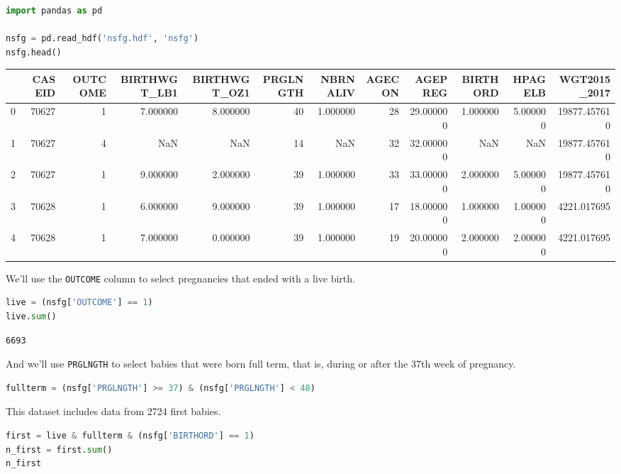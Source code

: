 \begin{lstlisting}[language=Python,style=source]
import pandas as pd

nsfg = pd.read_hdf('nsfg.hdf', 'nsfg')
nsfg.head()
\end{lstlisting}

\begin{tabular}{lrrrrrrrrrrr}
\midrule
 & CASEID & OUTCOME & BIRTHWGT\_LB1 & BIRTHWGT\_OZ1 & PRGLNGTH & NBRNALIV & AGECON & AGEPREG & BIRTHORD & HPAGELB & WGT2015\_2017 \\
\midrule
0 & 70627 & 1 & 7.000000 & 8.000000 & 40 & 1.000000 & 28 & 29.000000 & 1.000000 & 5.000000 & 19877.457610 \\
1 & 70627 & 4 & NaN & NaN & 14 & NaN & 32 & 32.000000 & NaN & NaN & 19877.457610 \\
2 & 70627 & 1 & 9.000000 & 2.000000 & 39 & 1.000000 & 33 & 33.000000 & 2.000000 & 5.000000 & 19877.457610 \\
3 & 70628 & 1 & 6.000000 & 9.000000 & 39 & 1.000000 & 17 & 18.000000 & 1.000000 & 1.000000 & 4221.017695 \\
4 & 70628 & 1 & 7.000000 & 0.000000 & 39 & 1.000000 & 19 & 20.000000 & 2.000000 & 2.000000 & 4221.017695 \\
\midrule
\end{tabular}

We'll use the \passthrough{\lstinline!OUTCOME!} column to select
pregnancies that ended with a live birth.

\begin{lstlisting}[language=Python,style=source]
live = (nsfg['OUTCOME'] == 1)
live.sum()
\end{lstlisting}

\begin{lstlisting}[style=output]
6693
\end{lstlisting}

And we'll use \passthrough{\lstinline!PRGLNGTH!} to select babies that
were born full term, that is, during or after the 37th week of
pregnancy.

\begin{lstlisting}[language=Python,style=source]
fullterm = (nsfg['PRGLNGTH'] >= 37) & (nsfg['PRGLNGTH'] < 48)
\end{lstlisting}

This dataset includes data from 2724 first babies.

\begin{lstlisting}[language=Python,style=source]
first = live & fullterm & (nsfg['BIRTHORD'] == 1)
n_first = first.sum()
n_first
\end{lstlisting}

